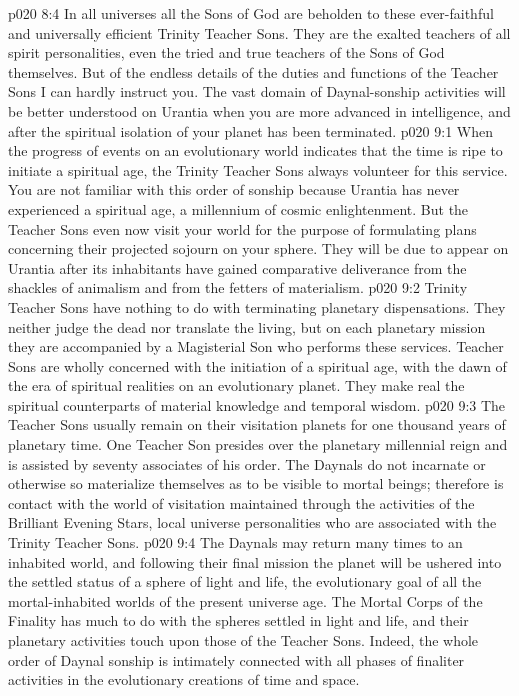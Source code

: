 \vs p020 8:4 In all universes all the Sons of God are beholden to these ever\hyp{}faithful and universally efficient Trinity Teacher Sons. They are the exalted teachers of all spirit personalities, even the tried and true teachers of the Sons of God themselves. But of the endless details of the duties and functions of the Teacher Sons I can hardly instruct you. The vast domain of Daynal\hyp{}sonship activities will be better understood on Urantia when you are more advanced in intelligence, and after the spiritual isolation of your planet has been terminated.
\vs p020 9:1 When the progress of events on an evolutionary world indicates that the time is ripe to initiate a spiritual age, the Trinity Teacher Sons always volunteer for this service. You are not familiar with this order of sonship because Urantia has never experienced a spiritual age, a millennium of cosmic enlightenment. But the Teacher Sons even now visit your world for the purpose of formulating plans concerning their projected sojourn on your sphere. They will be due to appear on Urantia after its inhabitants have gained comparative deliverance from the shackles of animalism and from the fetters of materialism.
\vs p020 9:2 Trinity Teacher Sons have nothing to do with terminating planetary dispensations. They neither judge the dead nor translate the living, but on each planetary mission they are accompanied by a Magisterial Son who performs these services. Teacher Sons are wholly concerned with the initiation of a spiritual age, with the dawn of the era of spiritual realities on an evolutionary planet. They make real the spiritual counterparts of material knowledge and temporal wisdom.
\vs p020 9:3 The Teacher Sons usually remain on their visitation planets for one thousand years of planetary time. One Teacher Son presides over the planetary millennial reign and is assisted by seventy associates of his order. The Daynals do not incarnate or otherwise so materialize themselves as to be visible to mortal beings; therefore is contact with the world of visitation maintained through the activities of the Brilliant Evening Stars, local universe personalities who are associated with the Trinity Teacher Sons.
\vs p020 9:4 The Daynals may return many times to an inhabited world, and following their final mission the planet will be ushered into the settled status of a sphere of light and life, the evolutionary goal of all the mortal\hyp{}inhabited worlds of the present universe age. The Mortal Corps of the Finality has much to do with the spheres settled in light and life, and their planetary activities touch upon those of the Teacher Sons. Indeed, the whole order of Daynal sonship is intimately connected with all phases of finaliter activities in the evolutionary creations of time and space.
